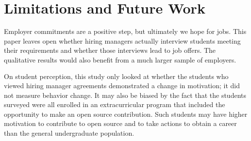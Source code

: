 \section{Limitations and Future Work}

Employer commitments are a positive step, but ultimately we hope for jobs. This paper leaves open whether hiring managers actually interview students meeting their requirements and whether those interviews lead to job offers. The qualitative results would also benefit from a much larger sample of employers.

On student perception, this study only looked at whether the students who viewed hiring manager agreements demonstrated a change in motivation; it did not measure behavior change. It may also be biased by the fact that the students surveyed were all enrolled in an extracurricular program that included the opportunity to make an open source contribution. Such students may have higher motivation to contribute to open source and to take actions to obtain a career than the general undergraduate population.